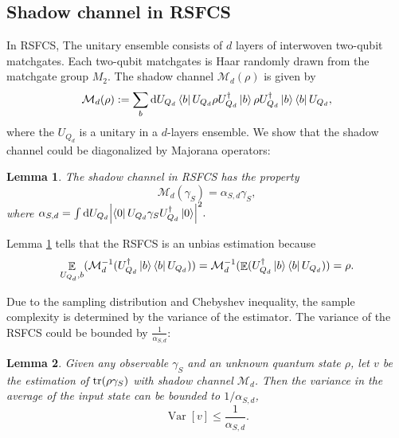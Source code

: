 \documentclass{article}
\newtheorem{lemma}{Lemma}
\newcommand{\mean}{\mathop{\mathbb{E}}}
\newcommand{\Var}{\mathop{\mathrm{Var}}}
\begin{document}

\subsection{Shadow channel in RSFCS}
\label{sec: shadow channel}
In RSFCS, 
The unitary ensemble consists of $ d$ layers of interwoven two-qubit matchgates. Each two-qubit matchgates is Haar randomly drawn from the matchgate group $M_2$.
The shadow channel $\mathcal{M}_d(\rho)$ is given by
\begin{equation}
    \mathcal{M}_d(\rho) := \sum_b \dd U_{Q_d} \bra{b}U_{Q_d} 
  \rho U_{Q_d}^\dagger \ket{b} \rho U_{Q_d}^\dagger \ket{b} \bra{b}U_{Q_d},
\end{equation}
where the $U_{Q_d}$ is a unitary in a $d$-layers ensemble. We show that the shadow channel could be diagonalized by Majorana operators:
\begin{lemma}
\label{lemma 1}
The shadow channel in RSFCS has the property
\begin{equation}
\mathcal{M}_d(\gamma_S) = \alpha_{S,d} \gamma_S,
\end{equation}
where 
$\alpha_{S,d} = \int \dd U_{Q_d} \abs{\bra{0}U_{Q_d} \gamma_S U_{Q_d}^\dagger\ket{0}}^2.$
\end{lemma}

Lemma \ref{lemma 1} tells that the RSFCS is an unbias estimation because 
\begin{equation}
    \mathop{\mathbb{E}}\limits_{U_{Q_d}, b } ( \mathcal{M}^{-1}_{d}(U_{Q_d}^\dagger \ket{b} \bra{b}U_{Q_d})) = \mathcal{M}^{-1}_{d}(\mean(U_{Q_d}^\dagger \ket{b} \bra{b}U_{Q_d}) ) = \rho.
\end{equation}



Due to the sampling distribution and Chebyshev inequality, the sample complexity is determined by the variance of the estimator. The variance of the RSFCS could be bounded by $\frac{1}{\alpha_{S,d}}$:
\begin{lemma}
\label{lemma 2}
Given any observable $\gamma_S$ and an unknown quantum state $\rho$, let $v$ be the estimation of $\tr(\rho \gamma_S)$ with shadow channel $\mathcal{M}_d$.
Then the variance in the average of the input state can be bounded to $1/\alpha_{S,d}$,
\begin{equation}
    \Var[v]\leq \frac{1}{\alpha_{S,d}}.
\end{equation}
\end{lemma}
\end{document}
